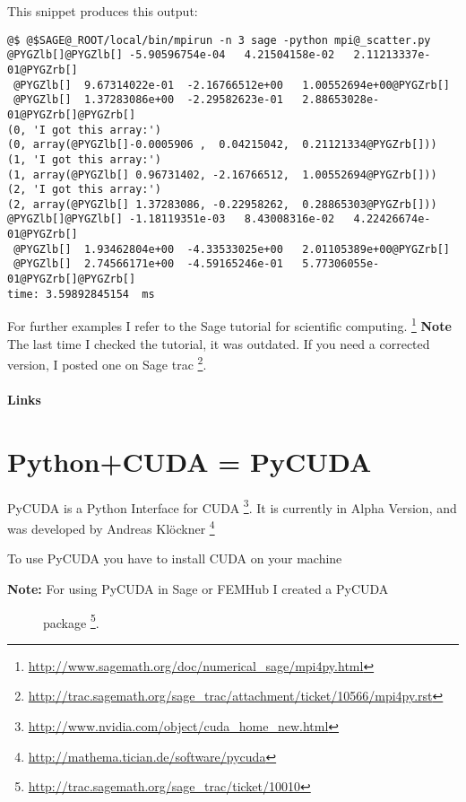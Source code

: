 \documentclass[letterpaper,10pt,english]{manual}
\begin{document}
This snippet produces this output:

\begin{Verbatim}[commandchars=@\[\]]
@$ @$SAGE@_ROOT/local/bin/mpirun -n 3 sage -python mpi@_scatter.py
@PYGZlb[]@PYGZlb[] -5.90596754e-04   4.21504158e-02   2.11213337e-01@PYGZrb[]
 @PYGZlb[]  9.67314022e-01  -2.16766512e+00   1.00552694e+00@PYGZrb[]
 @PYGZlb[]  1.37283086e+00  -2.29582623e-01   2.88653028e-01@PYGZrb[]@PYGZrb[]
(0, 'I got this array:')
(0, array(@PYGZlb[]-0.0005906 ,  0.04215042,  0.21121334@PYGZrb[]))
(1, 'I got this array:')
(1, array(@PYGZlb[] 0.96731402, -2.16766512,  1.00552694@PYGZrb[]))
(2, 'I got this array:')
(2, array(@PYGZlb[] 1.37283086, -0.22958262,  0.28865303@PYGZrb[]))
@PYGZlb[]@PYGZlb[] -1.18119351e-03   8.43008316e-02   4.22426674e-01@PYGZrb[]
 @PYGZlb[]  1.93462804e+00  -4.33533025e+00   2.01105389e+00@PYGZrb[]
 @PYGZlb[]  2.74566171e+00  -4.59165246e-01   5.77306055e-01@PYGZrb[]@PYGZrb[]
time: 3.59892845154  ms
\end{Verbatim}

For further examples I refer to the Sage tutorial for scientific
computing.  \footnote{
\href{http://www.sagemath.org/doc/numerical\_sage/mpi4py.html}{http://www.sagemath.org/doc/numerical\_sage/mpi4py.html}
}
\textbf{Note} The last time I checked the tutorial, it was outdated.
If you need a corrected version, I posted one on Sage trac \footnote{
\href{http://trac.sagemath.org/sage\_trac/attachment/ticket/10566/mpi4py.rst}{http://trac.sagemath.org/sage\_trac/attachment/ticket/10566/mpi4py.rst}
}.
\paragraph{Links}

\resetcurrentobjects
\hypertarget{--doc-PyCUDA}{}

\section{Python+CUDA = PyCUDA}

PyCUDA is a Python Interface for CUDA \footnote{
\href{http://www.nvidia.com/object/cuda\_home\_new.html}{http://www.nvidia.com/object/cuda\_home\_new.html}
}. It is currently in Alpha
Version, and was developed by Andreas Klöckner \footnote{
\href{http://mathema.tician.de/software/pycuda}{http://mathema.tician.de/software/pycuda}
}

To use PyCUDA you have to install CUDA on your machine
\begin{description}
\item[\textbf{Note:} For using PyCUDA in Sage or FEMHub I created a PyCUDA] \leavevmode
package \footnote{
\href{http://trac.sagemath.org/sage\_trac/ticket/10010}{http://trac.sagemath.org/sage\_trac/ticket/10010}
}.

\end{description}
\end{document}
